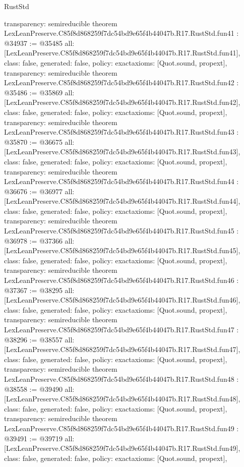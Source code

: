 \begin{lexlean}{RustStd}
\begin{coremodule}
{  transparency: semireducible
}
theorem LexLeanPreserve.C85f8d868259f7dc54bd9e65f4b44047b.R17.RustStd.fun41 : @34937 := @35485 {
  all: [LexLeanPreserve.C85f8d868259f7dc54bd9e65f4b44047b.R17.RustStd.fun41],
  class: false,
  generated: false,
  policy: exact{axioms: [Quot.sound, propext]},
  transparency: semireducible
}
theorem LexLeanPreserve.C85f8d868259f7dc54bd9e65f4b44047b.R17.RustStd.fun42 : @35486 := @35869 {
  all: [LexLeanPreserve.C85f8d868259f7dc54bd9e65f4b44047b.R17.RustStd.fun42],
  class: false,
  generated: false,
  policy: exact{axioms: [Quot.sound, propext]},
  transparency: semireducible
}
theorem LexLeanPreserve.C85f8d868259f7dc54bd9e65f4b44047b.R17.RustStd.fun43 : @35870 := @36675 {
  all: [LexLeanPreserve.C85f8d868259f7dc54bd9e65f4b44047b.R17.RustStd.fun43],
  class: false,
  generated: false,
  policy: exact{axioms: [Quot.sound, propext]},
  transparency: semireducible
}
theorem LexLeanPreserve.C85f8d868259f7dc54bd9e65f4b44047b.R17.RustStd.fun44 : @36676 := @36977 {
  all: [LexLeanPreserve.C85f8d868259f7dc54bd9e65f4b44047b.R17.RustStd.fun44],
  class: false,
  generated: false,
  policy: exact{axioms: [Quot.sound, propext]},
  transparency: semireducible
}
theorem LexLeanPreserve.C85f8d868259f7dc54bd9e65f4b44047b.R17.RustStd.fun45 : @36978 := @37366 {
  all: [LexLeanPreserve.C85f8d868259f7dc54bd9e65f4b44047b.R17.RustStd.fun45],
  class: false,
  generated: false,
  policy: exact{axioms: [Quot.sound, propext]},
  transparency: semireducible
}
theorem LexLeanPreserve.C85f8d868259f7dc54bd9e65f4b44047b.R17.RustStd.fun46 : @37367 := @38295 {
  all: [LexLeanPreserve.C85f8d868259f7dc54bd9e65f4b44047b.R17.RustStd.fun46],
  class: false,
  generated: false,
  policy: exact{axioms: [Quot.sound, propext]},
  transparency: semireducible
}
theorem LexLeanPreserve.C85f8d868259f7dc54bd9e65f4b44047b.R17.RustStd.fun47 : @38296 := @38557 {
  all: [LexLeanPreserve.C85f8d868259f7dc54bd9e65f4b44047b.R17.RustStd.fun47],
  class: false,
  generated: false,
  policy: exact{axioms: [Quot.sound, propext]},
  transparency: semireducible
}
theorem LexLeanPreserve.C85f8d868259f7dc54bd9e65f4b44047b.R17.RustStd.fun48 : @38558 := @39490 {
  all: [LexLeanPreserve.C85f8d868259f7dc54bd9e65f4b44047b.R17.RustStd.fun48],
  class: false,
  generated: false,
  policy: exact{axioms: [Quot.sound, propext]},
  transparency: semireducible
}
theorem LexLeanPreserve.C85f8d868259f7dc54bd9e65f4b44047b.R17.RustStd.fun49 : @39491 := @39719 {
  all: [LexLeanPreserve.C85f8d868259f7dc54bd9e65f4b44047b.R17.RustStd.fun49],
  class: false,
  generated: false,
  policy: exact{axioms: [Quot.sound, propext]},
}
\end{coremodule}
\end{lexlean}
